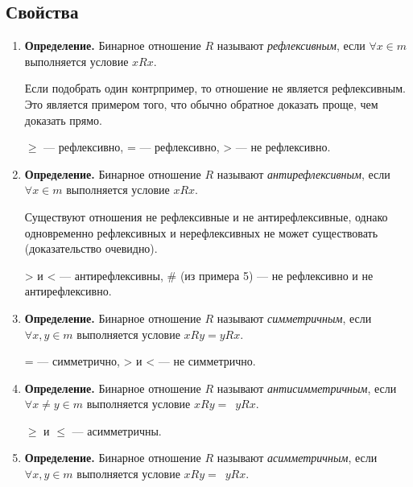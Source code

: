 \documentclass[russian]{lecture-notes}
\begin{document}
	\subsection{Свойства}
	\begin{enumerate}
		\item \textbf{Определение.} Бинарное отношение $R$ называют \textit{рефлексивным}, если $\forall x \in m$ выполняется условие $xRx$.
		\begin{remark}
			Если подобрать один контрпример, то отношение не является рефлексивным. Это является примером того, что обычно обратное доказать проще, чем доказать прямо.
		\end{remark}
		\begin{example}
			\char34$\geq$ --- рефлексивно, \char34= --- рефлексивно, \char34> --- не рефлексивно.
		\end{example}
		\item \textbf{Определение.} Бинарное отношение $R$ называют \textit{антирефлексивным}, если $\forall x \in m$ выполняется условие \sout{$xRx$}.
		\begin{remark}
			Существуют отношения не рефлексивные и не антирефлексивные, однако одновременно рефлексивных и нерефлексивных не может существовать (доказательство очевидно).
		\end{remark}
		\begin{example}
			\char34> и < --- антирефлексивны, \char34\# (из примера 5) --- не рефлексивно и не антирефлексивно.
		\end{example}
		\item \textbf{Определение.} Бинарное отношение $R$ называют \textit{симметричным}, если $\forall x,y \in m$ выполняется условие $xRy = yRx$.
		\begin{example}
			\char34= --- симметрично, \char34> и < --- не симметрично.
		\end{example}
		\item \textbf{Определение.} Бинарное отношение $R$ называют \textit{антисимметричным}, если $\forall x \neq y \in m$ выполняется условие $xRy =$~\sout{$yRx$}.
		\begin{example}
			\char34$\geq$ и $\leq$ --- асимметричны.
		\end{example}
		\item \textbf{Определение.} Бинарное отношение $R$ называют \textit{асимметричным}, если $\forall x,y \in m$ выполняется условие $xRy =$~\sout{$yRx$}.
		\begin{example}

\end{example}
\end{enumerate}
\end{document}
